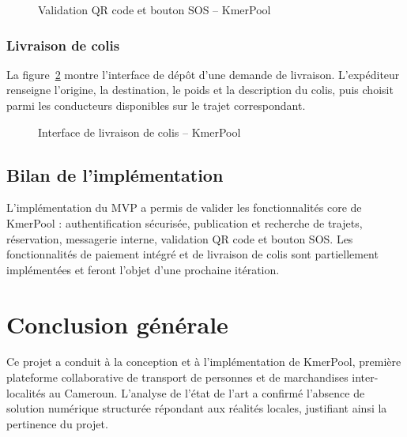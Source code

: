 \documentclass[12pt, a4paper]{report}
\begin{document}
\begin{figure}[H]
  \centering
  \caption{Validation QR code et bouton SOS -- KmerPool}
  \label{fig:screen3}
\end{figure}

\subsection{Livraison de colis}

La figure~\ref{fig:screen4} montre l'interface de dépôt d'une demande de livraison.
L'expéditeur renseigne l'origine, la destination, le poids et la description du colis,
puis choisit parmi les conducteurs disponibles sur le trajet correspondant.

\begin{figure}[H]
  \centering
  \caption{Interface de livraison de colis -- KmerPool}
  \label{fig:screen4}
\end{figure}

\section{Bilan de l'implémentation}

L'implémentation du \ac{MVP} a permis de valider les fonctionnalités core de KmerPool :
authentification sécurisée, publication et recherche de trajets, réservation, messagerie
interne, validation \ac{QR} code et bouton \ac{SOS}. Les fonctionnalités de paiement
intégré et de livraison de colis sont partiellement implémentées et feront l'objet
d'une prochaine itération.

\chapter*{Conclusion générale}

Ce projet a conduit à la conception et à l'implémentation de KmerPool, première
plateforme collaborative de transport de personnes et de marchandises inter-localités
au Cameroun. L'analyse de l'état de l'art a confirmé l'absence de solution numérique
structurée répondant aux réalités locales, justifiant ainsi la pertinence du projet.
\end{document}

